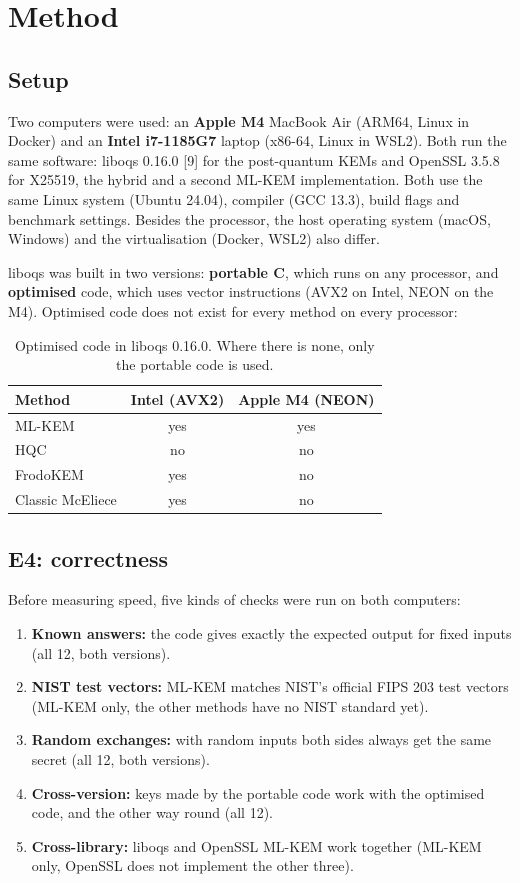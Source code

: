 \documentclass[11pt,a4paper]{article}
\begin{document}
\section{Method}
\subsection{Setup}
Two computers were used: an \textbf{Apple M4} MacBook Air (ARM64, Linux in Docker) and an \textbf{Intel
i7-1185G7} laptop (x86-64, Linux in WSL2). Both run the same software: liboqs 0.16.0 [9] for the
post-quantum KEMs and OpenSSL 3.5.8 for X25519, the hybrid and a second ML-KEM implementation. Both use the
same Linux system (Ubuntu 24.04), compiler (GCC 13.3), build flags and benchmark settings. Besides the
processor, the host operating system (macOS, Windows) and the virtualisation (Docker, WSL2) also differ.

liboqs was built in two versions: \textbf{portable C}, which runs on any processor, and \textbf{optimised}
code, which uses vector instructions (AVX2 on Intel, NEON on the M4). Optimised code does not exist for every
method on every processor:

\begin{table}[H]
\centering\small
\begin{tabular}{lcc}
\toprule
Method & Intel (AVX2) & Apple M4 (NEON) \\
\midrule
ML-KEM & yes & yes \\
HQC & no & no \\
FrodoKEM & yes & no \\
Classic McEliece & yes & no \\
\bottomrule
\end{tabular}
\caption{Optimised code in liboqs 0.16.0. Where there is none, only the portable code is used.}
\end{table}

\subsection{E4: correctness}
Before measuring speed, five kinds of checks were run on both computers:
\begin{enumerate}
  \item \textbf{Known answers:} the code gives exactly the expected output for fixed inputs (all 12, both versions).
  \item \textbf{NIST test vectors:} ML-KEM matches NIST's official FIPS 203 test vectors (ML-KEM only, the
  other methods have no NIST standard yet).
  \item \textbf{Random exchanges:} with random inputs both sides always get the same secret (all 12, both versions).
  \item \textbf{Cross-version:} keys made by the portable code work with the optimised code, and the other way
  round (all 12).
  \item \textbf{Cross-library:} liboqs and OpenSSL ML-KEM work together (ML-KEM only, OpenSSL does not
  implement the other three).
\end{enumerate}
\end{document}
